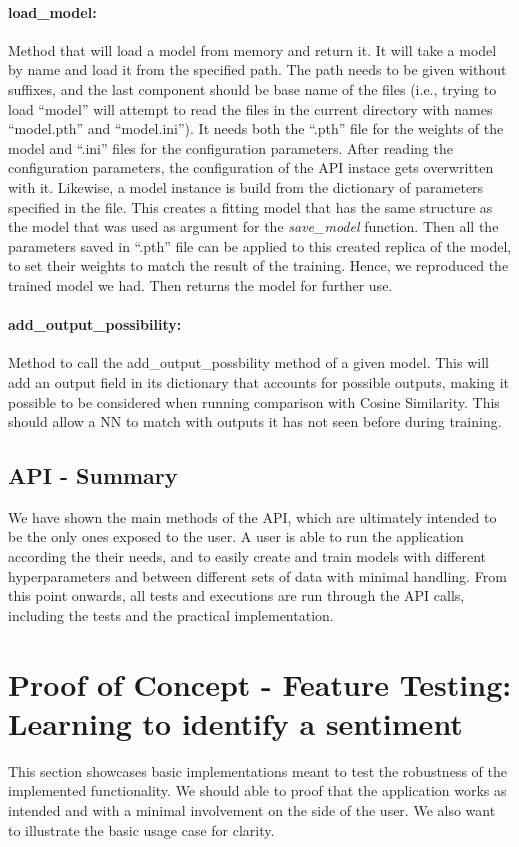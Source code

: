 \documentclass[a4paper, 11pt]{report}
\begin{document}
   \paragraph{load\_model:} Method that will load a model from memory and return it. It will take a model by name and load it from the specified path. The path needs to be given without suffixes, and the last component should be base name of the files (i.e., trying to load ``model'' will attempt to read the files in the current directory with names ``model.pth'' and ``model.ini''). It needs both the ``.pth'' file for the weights of the model and ``.ini'' files for the configuration parameters. After reading the configuration parameters, the configuration of the API instace gets overwritten with it. Likewise, a model instance is build from the dictionary of parameters specified in the file. This creates a fitting model that has the same structure as the model that was used as argument for the \textit{save\_model} function. Then all the parameters saved in ``.pth'' file can be applied to this created replica of the model, to set their weights to match the result of the training. Hence, we reproduced the trained model we had. Then returns the model for further use.

    \paragraph{add\_output\_possibility:} Method to call the add\_output\_possbility method of a given model. This will add an output field in its dictionary that accounts for possible outputs, making it possible to be considered when running comparison with Cosine Similarity. This should allow a NN to match with outputs it has not seen before during training.

\subsection{API - Summary}
We have shown the main methods of the API, which are ultimately intended to be the only ones exposed to the user. A user is able to run the application according the their needs, and to easily create and train models with different hyperparameters and between different sets of data with minimal handling. From this point onwards, all tests and executions are run through the API calls, including the tests and the practical implementation.

\section{Proof of Concept - Feature Testing: Learning to identify a sentiment} \label{Section: POC}
This section showcases basic implementations meant to test the robustness of the implemented functionality. We should able to proof that the application works as intended and with a minimal involvement on the side of the user. We also want to illustrate the basic usage case for clarity.
\end{document}
